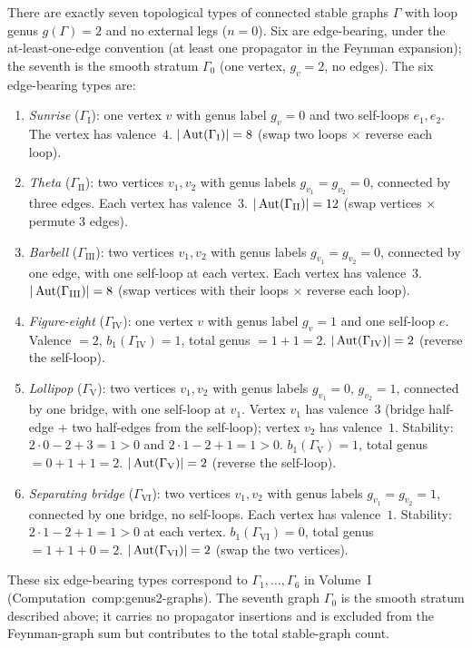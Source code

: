 \begin{lemma}
\label{lem:genus-2-stable-graphs}
There are exactly seven topological types of connected stable
graphs $\Gamma$ with loop genus $g(\Gamma) = 2$ and no external
legs ($n = 0$). Six are edge-bearing, under the at-least-one-edge
convention (at least one propagator in the Feynman expansion);
the seventh is the smooth stratum $\Gamma_0$
(one vertex, $g_v = 2$, no edges). %
The six edge-bearing types are:
\begin{enumerate}[label=\textup{(\Roman*)}]
\item \emph{Sunrise} ($\Gamma_{\mathrm{I}}$): one vertex
 $v$ with genus label $g_v = 0$ and two self-loops $e_1, e_2$.
 The vertex has valence~$4$.
 $|\operatorname{Aut}(\Gamma_{\mathrm{I}})| = 8$ (swap two
 loops $\times$ reverse each loop).
\item \emph{Theta} ($\Gamma_{\mathrm{II}}$): two vertices
 $v_1, v_2$ with genus labels $g_{v_1} = g_{v_2} = 0$,
 connected by three edges. Each vertex has valence~$3$.
 $|\operatorname{Aut}(\Gamma_{\mathrm{II}})| = 12$ (swap vertices
 $\times$ permute $3$ edges).
\item \emph{Barbell} ($\Gamma_{\mathrm{III}}$): two
 vertices $v_1, v_2$ with genus labels
 $g_{v_1} = g_{v_2} = 0$, connected by one edge, with one
 self-loop at each vertex. Each vertex has valence~$3$.
 $|\operatorname{Aut}(\Gamma_{\mathrm{III}})| = 8$ (swap vertices with
 their loops $\times$ reverse each loop).
\item \emph{Figure-eight}
 ($\Gamma_{\mathrm{IV}}$): one vertex $v$ with genus label
 $g_v = 1$ and one self-loop $e$. Valence $= 2$,
 $b_1(\Gamma_{\mathrm{IV}}) = 1$, total genus
 $= 1 + 1 = 2$.
 $|\operatorname{Aut}(\Gamma_{\mathrm{IV}})| = 2$ (reverse the self-loop).
\item \emph{Lollipop} ($\Gamma_{\mathrm{V}}$): two vertices
 $v_1, v_2$ with genus labels $g_{v_1} = 0$, $g_{v_2} = 1$,
 connected by one bridge, with one self-loop at $v_1$.
 Vertex $v_1$ has valence~$3$ (bridge half-edge $+$ two
 half-edges from the self-loop); vertex $v_2$ has valence~$1$.
 Stability: $2 \cdot 0 - 2 + 3 = 1 > 0$ and
 $2 \cdot 1 - 2 + 1 = 1 > 0$.
 $b_1(\Gamma_{\mathrm{V}}) = 1$, total genus $= 0 + 1 + 1 = 2$.
 $|\operatorname{Aut}(\Gamma_{\mathrm{V}})| = 2$ (reverse the self-loop).
\item \emph{Separating bridge} ($\Gamma_{\mathrm{VI}}$): two
 vertices $v_1, v_2$ with genus labels
 $g_{v_1} = g_{v_2} = 1$, connected by one bridge, no
 self-loops. Each vertex has valence~$1$.
 Stability: $2 \cdot 1 - 2 + 1 = 1 > 0$ at each vertex.
 $b_1(\Gamma_{\mathrm{VI}}) = 0$, total genus $= 1 + 1 + 0 = 2$.
 $|\operatorname{Aut}(\Gamma_{\mathrm{VI}})| = 2$ (swap the two vertices).
\end{enumerate}
These six edge-bearing types correspond to $\Gamma_1, \ldots, \Gamma_6$ in
Volume~I (Computation~\textup{comp:genus2-graphs}). The seventh
graph $\Gamma_0$ is the smooth stratum described above; it carries
no propagator insertions and is excluded from the Feynman-graph sum
but contributes to the total stable-graph count. %
\end{lemma}

